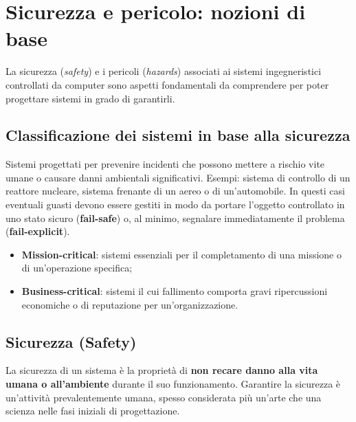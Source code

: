 \chapter{Sicurezza e pericolo: nozioni di base}
\label{cap:sicurezza-base}

La sicurezza (\emph{safety}) e i pericoli (\emph{hazards}) associati ai sistemi ingegneristici controllati da computer sono aspetti fondamentali da comprendere per poter progettare sistemi in grado di garantirli.

\section{Classificazione dei sistemi in base alla sicurezza}
\begin{defn}
Sistemi progettati per prevenire incidenti che possono mettere a rischio vite umane o causare danni ambientali significativi. Esempi: sistema di controllo di un reattore nucleare, sistema frenante di un aereo o di un'automobile. In questi casi eventuali guasti devono essere gestiti in modo da portare l'oggetto controllato in uno stato sicuro (\textbf{fail-safe}) o, al minimo, segnalare immediatamente il problema (\textbf{fail-explicit}).
\end{defn}

\begin{itemize}
    \item \textbf{Mission-critical}: sistemi essenziali per il completamento di una missione o di un'operazione specifica;
    \item \textbf{Business-critical}: sistemi il cui fallimento comporta gravi ripercussioni economiche o di reputazione per un'organizzazione.
\end{itemize}

\section{Sicurezza (Safety)}
\begin{defn}[Sicurezza]
La sicurezza di un sistema è la proprietà di \textbf{non recare danno alla vita umana o all'ambiente} durante il suo funzionamento. Garantire la sicurezza è un'attività prevalentemente umana, spesso considerata più un'arte che una scienza nelle fasi iniziali di progettazione.
\end{defn}

